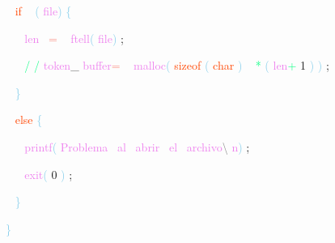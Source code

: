 \documentclass[10, usernames, dvipsnames]{beamer}
\begin{document}
\begin{frame}
\textcolor{White}{\   }
\textcolor{OrangeRed}{if}
\textcolor{White}{\ }
\textcolor{SkyBlue}{(}
\textcolor{Violet}{file}\textcolor{SkyBlue}{)}
\textcolor{SkyBlue}{\{ }

 \textcolor{White}{\   }
\textcolor{White}{\   }
\textcolor{Violet}{len}\textcolor{White}{\ }
\textcolor{Salmon}{=}
\textcolor{White}{\ }
\textcolor{Violet}{ftell}\textcolor{SkyBlue}{(}
\textcolor{Violet}{file}\textcolor{SkyBlue}{)}
\textcolor{Sepia}{;}

 \textcolor{White}{\   }
\textcolor{White}{\   }
\textcolor{SpringGreen}{/}
\textcolor{SpringGreen}{/}
\textcolor{Violet}{token}\textcolor{Sepia}{\_}
\textcolor{Violet}{buffer}\textcolor{Salmon}{=}
\textcolor{White}{\ }
\textcolor{Violet}{malloc}\textcolor{SkyBlue}{(}
\textcolor{OrangeRed}{sizeof}
\textcolor{SkyBlue}{(}
\textcolor{OrangeRed}{char}
\textcolor{SkyBlue}{)}
\textcolor{White}{\ }
\textcolor{SpringGreen}{*}
\textcolor{SkyBlue}{(}
\textcolor{Violet}{len}\textcolor{SpringGreen}{+}
\textcolor{RedViolet}{1}
\textcolor{SkyBlue}{)}
\textcolor{SkyBlue}{)}
\textcolor{Sepia}{;}

 \textcolor{White}{\   }
\textcolor{SkyBlue}{\} }

 \textcolor{White}{\   }
\textcolor{OrangeRed}{else}
\textcolor{SkyBlue}{\{ }

 \textcolor{White}{\   }
\textcolor{White}{\   }
\textcolor{Violet}{printf}\textcolor{SkyBlue}{(}
\textcolor{Violet}{Problema}\textcolor{White}{\ }
\textcolor{Violet}{al}\textcolor{White}{\ }
\textcolor{Violet}{abrir}\textcolor{White}{\ }
\textcolor{Violet}{el}\textcolor{White}{\ }
\textcolor{Violet}{archivo}\textcolor{Gray}{\textbackslash }
\textcolor{Violet}{n}\textcolor{SkyBlue}{)}
\textcolor{Sepia}{;}

 \textcolor{White}{\   }
\textcolor{White}{\   }
\textcolor{Violet}{exit}\textcolor{SkyBlue}{(}
\textcolor{RedViolet}{0}
\textcolor{SkyBlue}{)}
\textcolor{Sepia}{;}

 \textcolor{White}{\   }
\textcolor{SkyBlue}{\} }

 
 \textcolor{SkyBlue}{\} }

 \end{frame}
\end{document}
